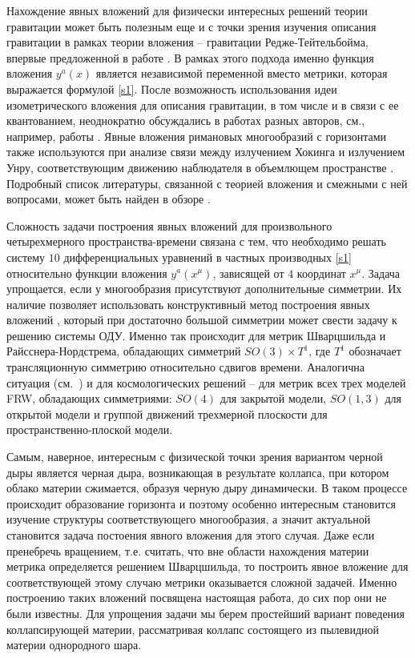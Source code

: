 \documentclass[12pt]{article}
\begin{document}
Нахождение явных вложений для физически интересных решений теории гравитации может быть полезным
еще и с точки зрения изучения описания гравитации в рамках теории вложения -- гравитации Редже-Тейтельбойма, впервые предложенной в работе \cite{regge}.
В рамках этого подхода именно функция вложения $y^a(x)$ является независимой переменной вместо метрики,
которая выражается формулой \eqref{s1}.
После \cite{regge} возможность использования идеи изометрического вложения для описания гравитации, в том числе и в связи с ее квантованием,
неоднократно обсуждались в работах разных авторов, см., например,
работы \cite{deser,pavsic85let,tapia,davkar,statja18,rojas09,statja25,faddeev,statja51}.
Явные вложения римановых многообразий с горизонтами также используются при анализе связи между излучением Хокинга
и излучением Унру, соответствующим движению наблюдателя в объемлющем пространстве \cite{deserlev98,deserlev99,statja36}.
Подробный список литературы, связанной с теорией вложения и смежными с ней вопросами, может быть найден в обзоре \cite{tapiaob}.

Сложность задачи построения явных вложений для произвольного четырехмерного пространства-времени связана с тем, что
необходимо решать систему $10$ дифференциальных уравнений  в частных производных \eqref{s1} относительно функции вложения $y^a(x^\mu)$,
зависящей от $4$ координат $x^\mu$.  
Задача упрощается, если у многообразия присутствуют дополнительные симметрии.
Их наличие позволяет использовать конструктивный метод построения явных вложений \cite{statja27}, который при
достаточно большой симметрии может свести задачу к решению системы ОДУ.
Именно так происходит для метрик Шварцшильда и Райсснера-Нордстрема, обладающих симметрий $SO(3)\times T^1$, где $T^1$ обозначает трансляционную симметрию
относительно сдвигов времени. Аналогична ситуация (см.~\cite{statja29}) и для космологических решений --
для метрик всех трех моделей FRW, обладающих симметриями: $SO(4)$ для закрытой модели, $SO(1,3)$ для открытой модели
и группой движений трехмерной плоскости для пространственно-плоской модели.

Самым, наверное,  интересным с физической точки зрения вариантом черной дыры является черная дыра, возникающая в результате коллапса,
при котором облако материи сжимается, образуя черную дыру динамически. В таком процессе происходит образование горизонта
и поэтому особенно интересным становится изучение структуры соответствующего многообразия, а значит актуальной становится
задача постоения явного вложения для этого случая.
Даже если пренебречь вращением, т.е. считать, что вне области нахождения материи метрика определяется
решением Шварцшильда, то построить явное вложение для соответствующей этому случаю метрики оказывается
сложной задачей. Именно построению таких вложений посвящена настоящая работа, до сих пор они не были известны.
Для упрощения задачи мы берем простейший вариант поведения коллапсирующей материи, рассматривая коллапс
состоящего из пылевидной материи однородного шара. 
\end{document}
